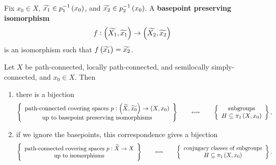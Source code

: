 \pagebreak


Fix $ x_0 \in X $, $ \widetilde{x_1} \in p_1^{-1}\br{x_0} $, and $ \widetilde{x_2} \in p_2^{-1}\br{x_0} $. A \textbf{basepoint preserving isomorphism}
$$ f : \br{\widetilde{X_1}, \widetilde{x_1}} \to \br{\widetilde{X_2}, \widetilde{x_2}} $$
is an isomorphism such that $ f\br{\widetilde{x_1}} = \widetilde{x_2} $.

\begin{theorem}
Let $ X $ be path-connected, locally path-connected, and semilocally simply-connected, and $ x_0 \in X $. Then
\begin{enumerate}
\item there is a bijection
$$ \correspondence{\text{path-connected covering spaces} \ p : \br{\widetilde{X}, \widetilde{x_0}} \to \br{X, x_0} \\ \text{up to basepoint preserving isomorphisms}}{\text{subgroups} \\ H \subseteq \pi_1\br{X, x_0}}, $$
\item if we ignore the basepoints, this correspondence gives a bijection
$$ \correspondence{\text{path-connected covering spaces} \ p : \widetilde{X} \to X \\ \text{up to isomorphisms}}{\text{conjugacy classes of subgroups} \\ H \subseteq \pi_1\br{X, x_0}}. $$
\end{enumerate}
\end{theorem}

